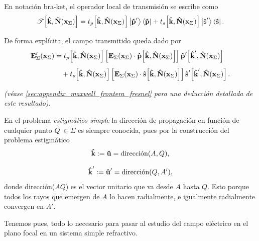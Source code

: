 En notación bra-ket, el operador local de transmisión se escribe como
\begin{equation}
  \mathscr{T}\!\left[
  \bm{\hat{\mathbf{k}}},\bm{\hat{\mathbf{N}}}(\vb x_\Sigma)
  \right]
  =
  t_p\!\left[
  \bm{\hat{\mathbf{k}}},\bm{\hat{\mathbf{N}}}(\vb x_\Sigma)
  \right]
  \ket{\bm{\hat{\mathbf{p}}}'}
  \bra{\bm{\hat{\mathbf{p}}}}
  +
  t_s\!\left[
  \bm{\hat{\mathbf{k}}},\bm{\hat{\mathbf{N}}}(\vb x_\Sigma)
  \right]
  \ket{\bm{\hat{\mathbf{s}}}'}
  \bra{\bm{\hat{\mathbf{s}}}}.
\end{equation}

De forma explícita, el campo transmitido queda dado por
\begin{equation}
  \begin{aligned}
  \vb{E}'_{\Sigma}(\vb x_\Sigma)
  &=
  t_p\!\left[
  \bm{\hat{\mathbf{k}}},\bm{\hat{\mathbf{N}}}(\vb x_\Sigma)
  \right]
  \left[
  \vb{E}_{\Sigma}(\vb x_\Sigma)\cdot
  \bm{\hat{\mathbf{p}}}\!\left[
  \bm{\hat{\mathbf{k}}},\bm{\hat{\mathbf{N}}}(\vb x_\Sigma)
  \right]
  \right]
  \bm{\hat{\mathbf{p}}}'\!\left[
  \bm{\hat{\mathbf{k}}}',\bm{\hat{\mathbf{N}}}(\vb x_\Sigma)
  \right]
  \\[4pt]
  &\quad+
  t_s\!\left[
  \bm{\hat{\mathbf{k}}},\bm{\hat{\mathbf{N}}}(\vb x_\Sigma)
  \right]
  \left[
  \vb{E}_{\Sigma}(\vb x_\Sigma)\cdot
  \bm{\hat{\mathbf{s}}}\!\left[
  \bm{\hat{\mathbf{k}}},\bm{\hat{\mathbf{N}}}(\vb x_\Sigma)
  \right]
  \right]
  \bm{\hat{\mathbf{s}}}'\!\left[
  \bm{\hat{\mathbf{k}}}',\bm{\hat{\mathbf{N}}}(\vb x_\Sigma)
  \right].
  \end{aligned}
  \label{eq:Transmited_E_field_in_Sigma}
\end{equation}

\textit{(véase \ref{sec:appendix_maxwell_frontera_fresnel} para una deducción detallada de este resultado)}.

En el problema \textit{estigmático simple} la dirección de propagación en función de cualquier punto $Q \ \in \Sigma$ es siempre conocida, pues por la construcción del problema estigmático
$$
\bm{\hat{\mathbf{k}}} := \bm{\hat{\mathbf{u}}} = \text{dirección}(A, Q),
$$

$$
\bm{\hat{\mathbf{k}}}':= \bm{\hat{\mathbf{u}}}' = \text{dirección}(Q, A'),
$$
donde dirección($AQ$) es el vector unitario que va desde $A$ hasta $Q$.
Esto porque todos los rayos que emergen de $A$ lo hacen radialmente, e igualmente radialmente convergen en $A'$.

Tenemos pues, todo lo necesario para pasar al estudio del campo eléctrico en el plano focal en un sistema simple refractivo.



